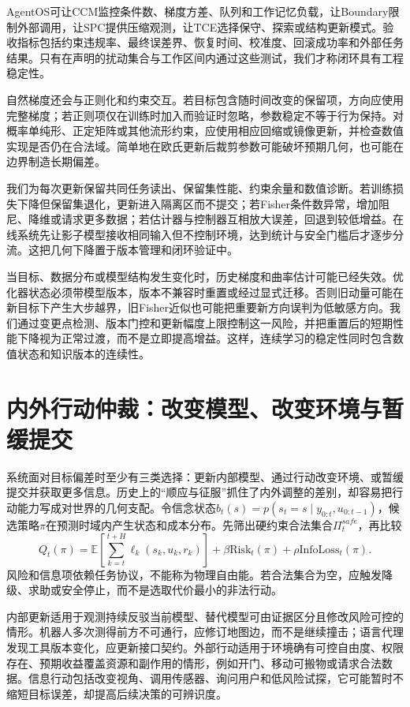 AgentOS可让CCM监控条件数、梯度方差、队列和工作记忆负载，让Boundary限制外部调用，让SPC提供压缩观测，让TCE选择保守、探索或结构更新模式。验收指标包括约束违规率、最终误差界、恢复时间、校准度、回滚成功率和外部任务结果。只有在声明的扰动集合与工作区间内通过这些测试，我们才称闭环具有工程稳定性。

自然梯度还会与正则化和约束交互。若目标包含随时间改变的保留项，方向应使用完整梯度；若正则项仅在训练时加入而验证时忽略，参数稳定不等于行为保持。对概率单纯形、正定矩阵或其他流形约束，应使用相应回缩或镜像更新，并检查数值实现是否仍在合法域。简单地在欧氏更新后裁剪参数可能破坏预期几何，也可能在边界制造长期偏差。

我们为每次更新保留共同任务读出、保留集性能、约束余量和数值诊断。若训练损失下降但保留集退化，更新进入隔离区而不提交；若Fisher条件数异常，增加阻尼、降维或请求更多数据；若估计器与控制器互相放大误差，回退到较低增益。在线系统先让影子模型接收相同输入但不控制环境，达到统计与安全门槛后才逐步分流。这把几何下降置于版本管理和闭环验证中。

当目标、数据分布或模型结构发生变化时，历史梯度和曲率估计可能已经失效。优化器状态必须带模型版本，版本不兼容时重置或经过显式迁移。否则旧动量可能在新目标下产生大步越界，旧Fisher近似也可能把重要新方向误判为低敏感方向。我们通过变更点检测、版本门控和更新幅度上限控制这一风险，并把重置后的短期性能下降视为正常过渡，而不是立即提高增益。这样，连续学习的稳定性同时包含数值状态和知识版本的连续性。

\section{内外行动仲裁：改变模型、改变环境与暂缓提交}
\label{sec:section_8007}

系统面对目标偏差时至少有三类选择：更新内部模型、通过行动改变环境、或暂缓提交并获取更多信息。历史上的“顺应与征服”抓住了内外调整的差别，却容易把行动能力写成对世界的几何支配。令信念状态$b_t(s)=p(s_t=s\mid y_{0:t},u_{0:t-1})$，候选策略$\pi$在预测时域内产生状态和成本分布。先筛出硬约束合法集合$\Pi_t^{safe}$，再比较
\begin{equation}
Q_t(\pi)=\mathbb E\!\left[\sum_{k=t}^{t+H}\ell_k(s_k,u_k,r_k)\right]+\beta\mathrm{Risk}_t(\pi)+\rho\mathrm{InfoLoss}_t(\pi).
\end{equation}
风险和信息项依赖任务协议，不能称为物理自由能。若合法集合为空，应触发降级、求助或安全停止，而不是选取代价最小的非法行动。

内部更新适用于观测持续反驳当前模型、替代模型可由证据区分且修改风险可控的情形。机器人多次测得前方不可通行，应修订地图边，而不是继续撞击；语言代理发现工具版本变化，应更新接口契约。外部行动适用于环境确有可控自由度、权限存在、预期收益覆盖资源和副作用的情形，例如开门、移动可搬物或请求合法数据。信息行动包括改变视角、调用传感器、询问用户和低风险试探，它可能暂时不缩短目标误差，却提高后续决策的可辨识度。

